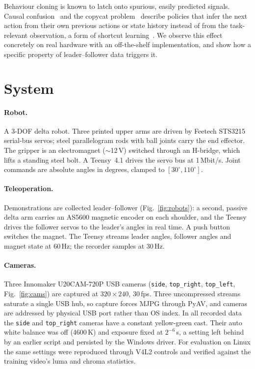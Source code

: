 \documentclass[10pt,twocolumn,letterpaper]{article}
\begin{document}
Behaviour cloning is known to latch onto spurious, easily predicted signals. Causal
confusion~\cite{dehaan2019causal} and the copycat problem~\cite{wen2020copycat} describe policies
that infer the next action from their own previous actions or state history instead of from the
task-relevant observation, a form of shortcut learning~\cite{geirhos2020shortcut}. We observe
this effect concretely on real hardware with an off-the-shelf implementation, and show how a
specific property of leader--follower data triggers it.

\section{System}

\paragraph{Robot.} A 3-DOF delta robot. Three printed upper arms are driven by Feetech STS3215
serial-bus servos; steel parallelogram rods with ball joints carry the end effector. The gripper
is an electromagnet ($\sim$12\,V) switched through an H-bridge, which lifts a standing steel bolt.
A Teensy~4.1 drives the servo bus at 1\,Mbit/s. Joint commands are absolute angles in degrees,
clamped to $[30^\circ, 110^\circ]$.

\paragraph{Teleoperation.} Demonstrations are collected leader--follower
(Fig.~\ref{fig:robots}): a second, passive delta arm carries an AS5600 magnetic encoder on each
shoulder, and the Teensy drives the follower servos to the leader's angles in real time. A push
button switches the magnet. The Teensy streams leader angles, follower angles and magnet state at
60\,Hz; the recorder samples at 30\,Hz.

\paragraph{Cameras.} Three Innomaker U20CAM-720P USB cameras (\texttt{side}, \texttt{top\_right},
\texttt{top\_left}, Fig.~\ref{fig:cams}) are captured at $320\times240$, 30\,fps. Three
uncompressed streams saturate a single USB hub, so capture forces MJPG through PyAV, and cameras
are addressed by physical USB port rather than OS index. In all recorded data the \texttt{side}
and \texttt{top\_right} cameras have a constant yellow-green cast. Their auto white balance was
off (4600\,K) and exposure fixed at $2^{-6}$\,s, a setting left behind by an earlier script and
persisted by the Windows driver. For evaluation on Linux the same settings were reproduced through
V4L2 controls and verified against the training video's luma and chroma statistics.
\end{document}
